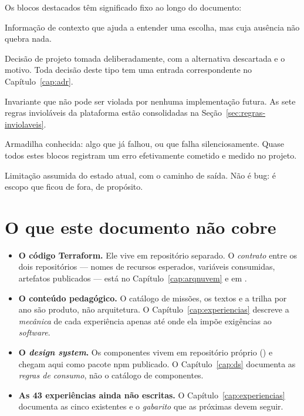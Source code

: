 Os blocos destacados têm significado fixo ao longo do documento:

\begin{nota}
Informação de contexto que ajuda a entender uma escolha, mas cuja ausência não
quebra nada.
\end{nota}

\begin{decisao}
Decisão de projeto tomada deliberadamente, com a alternativa descartada e o
motivo. Toda decisão deste tipo tem uma entrada correspondente no
Capítulo~\ref{cap:adr}.
\end{decisao}

\begin{regra}
Invariante que não pode ser violada por nenhuma implementação futura. As sete
regras invioláveis da plataforma estão consolidadas na
Seção~\ref{sec:regras-inviolaveis}.
\end{regra}

\begin{atencao}
Armadilha conhecida: algo que já falhou, ou que falha silenciosamente. Quase
todos estes blocos registram um erro efetivamente cometido e medido no projeto.
\end{atencao}

\begin{limitacao}
Limitação assumida do estado atual, com o caminho de saída. Não é bug: é escopo
que ficou de fora, de propósito.
\end{limitacao}

\section{O que este documento não cobre}

\begin{itemize}
  \item \textbf{O código Terraform.} Ele vive em repositório separado. O
    \emph{contrato} entre os dois repositórios --- nomes de recursos esperados,
    variáveis consumidas, artefatos publicados --- está no
    Capítulo~\ref{cap:arqnuvem} e em .
  \item \textbf{O conteúdo pedagógico.} O catálogo de missões, os textos e a
    trilha por ano são produto, não arquitetura. O Capítulo~\ref{cap:experiencias}
    descreve a \emph{mecânica} de cada experiência apenas até onde ela impõe
    exigências ao \emph{software}.
  \item \textbf{O \emph{design system}.} Os componentes vivem em repositório
    próprio () e chegam aqui como pacote npm publicado. O
    Capítulo~\ref{cap:ds} documenta as \emph{regras de consumo}, não o catálogo
    de componentes.
  \item \textbf{As 43 experiências ainda não escritas.} O
    Capítulo~\ref{cap:experiencias} documenta as cinco existentes e o
    \emph{gabarito} que as próximas devem seguir.
\end{itemize}
